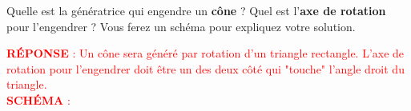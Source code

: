 \documentclass[12pt,a4paper]{article} %
\begin{document}






\newpage


\begin{exo} Quelle est la génératrice qui engendre un \textbf{cône} ? Quel est l'\textbf{axe de rotation} pour l'engendrer ? Vous ferez un schéma pour expliquez votre solution.\end{exo}


\textcolor{red}{\textbf{RÉPONSE} : Un cône sera généré par rotation d'un triangle rectangle. L'axe de rotation pour l'engendrer doit être un des deux côté qui "touche" l'angle droit du triangle.} \\

\textcolor{red}{\textbf{SCHÉMA} :}



\end{document}
